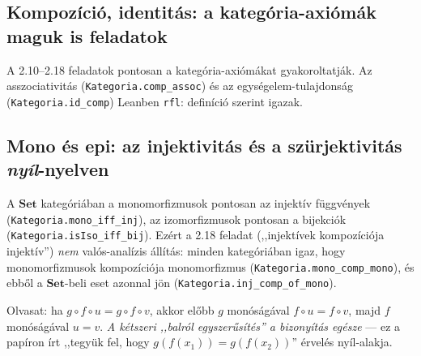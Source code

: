 \documentclass[11pt,a4paper]{article}
\newcommand{\lean}[1]{\texttt{\small #1}}
\theoremstyle{definition}
\begin{document}
\subsection{Kompozíció, identitás: a kategória-axiómák maguk is feladatok}

A 2.10--2.18 feladatok pontosan a kategória-axiómákat gyakoroltatják.
Az asszociativitás (\lean{Kategoria.comp\_assoc}) és az egységelem-tulajdonság
(\lean{Kategoria.id\_comp}) Leanben \lean{rfl}: definíció szerint igazak.

\begin{center}
\end{center}

\subsection{Mono és epi: az injektivitás és a szürjektivitás \emph{nyíl}-nyelven}

A $\mathbf{Set}$ kategóriában a monomorfizmusok pontosan az injektív függvények
(\lean{Kategoria.mono\_iff\_inj}), az izomorfizmusok pontosan a bijekciók
(\lean{Kategoria.isIso\_iff\_bij}). Ezért a 2.18 feladat (,,injektívek
kompozíciója injektív'') \emph{nem} valós-analízis állítás: minden kategóriában igaz,
hogy monomorfizmusok kompozíciója monomorfizmus
(\lean{Kategoria.mono\_comp\_mono}), és ebből a $\mathbf{Set}$-beli eset
azonnal jön (\lean{Kategoria.inj\_comp\_of\_mono}).

\begin{center}
\end{center}
\noindent
Olvasat: ha $g\circ f\circ u = g\circ f\circ v$, akkor előbb $g$ monóságával
$f\circ u = f\circ v$, majd $f$ monóságával $u = v$. \emph{A kétszeri
,,balról egyszerűsítés'' a bizonyítás egésze} --- ez a papíron írt
,,tegyük fel, hogy $g(f(x_1)) = g(f(x_2))$'' érvelés nyíl-alakja.
\end{document}
